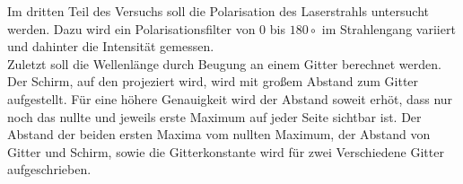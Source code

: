 Im dritten Teil des Versuchs soll die Polarisation des Laserstrahls untersucht werden.
Dazu wird ein Polarisationsfilter von $0$ bis $180\circ$ im Strahlengang variiert und dahinter die Intensität gemessen.\\

Zuletzt soll die Wellenlänge durch Beugung an einem Gitter berechnet werden.
Der Schirm, auf den projeziert wird, wird mit großem Abstand zum Gitter aufgestellt.
Für eine höhere Genauigkeit wird der Abstand soweit erhöt, dass nur noch das nullte und jeweils erste Maximum auf jeder Seite sichtbar ist.
Der Abstand der beiden ersten Maxima vom nullten Maximum, der Abstand von Gitter und Schirm, sowie die Gitterkonstante wird für zwei Verschiedene Gitter aufgeschrieben.
